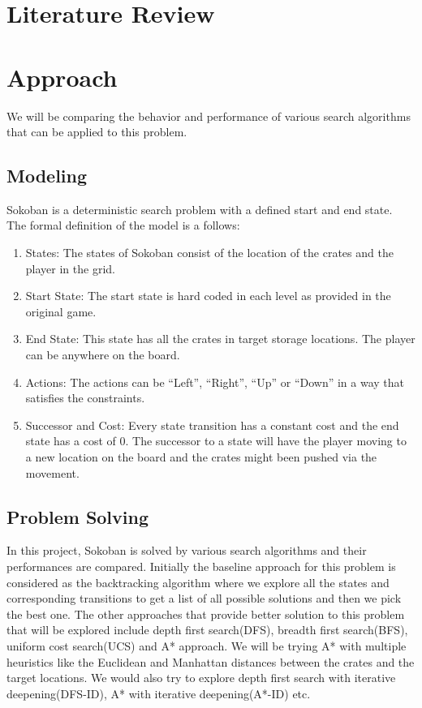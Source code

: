 \documentclass[10pt, final]{article}
\begin{document}
\section{Literature Review}

\section{Approach}
We will be comparing the behavior and performance of various search algorithms that can be applied to this problem.
\subsection{Modeling}
Sokoban is a deterministic search problem with a defined start and end state. The formal definition of the model is a follows:
\begin{enumerate}
  \item States: The states of Sokoban consist of the location of the crates and the player in the grid.
  \item Start State: The start state is hard coded in each level as provided in the original game.
  \item End State: This state has all the crates in target storage locations. The player can be anywhere on the board.
  \item Actions: The actions can be ``Left'', ``Right'', ``Up'' or ``Down'' in a way that satisfies the constraints.
  \item Successor and Cost: Every state transition has a constant cost and the end state has a cost of $0$. The successor to a state will have the player moving to a new location on the board and the crates might been pushed via the movement.
\end{enumerate}
\subsection{Problem Solving}
In this project, Sokoban is solved by various search algorithms and their performances are compared. Initially the baseline approach for this problem is considered as the backtracking algorithm where we explore all the states and corresponding transitions to get a list of all possible solutions and then we pick the best one. The other approaches that provide better solution to this problem that will be explored include depth first search(DFS), breadth first search(BFS), uniform cost search(UCS) and A* approach. We will be trying A* with multiple heuristics like the Euclidean and Manhattan distances between the crates and the target locations. We would also try to explore depth first search with iterative deepening(DFS-ID), A* with iterative deepening(A*-ID) etc.
\end{document}
